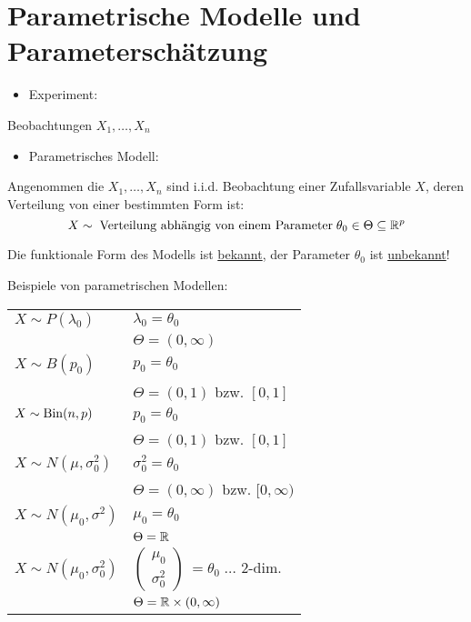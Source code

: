 \documentclass{tstextbook}
\begin{document}
\section{Parametrische Modelle und Parameterschätzung}
		\label{parameterschaetzung}


\begin{itemize}
	\item Experiment:
\end{itemize}
Beobachtungen $ X_1,\ldots,X_n $\\

\begin{itemize}
	\item Parametrisches Modell:
\end{itemize}
Angenommen die $ X_1,\ldots,X_n $ sind i.i.d. Beobachtung einer Zufallsvariable $ X $, deren 
Verteilung von einer bestimmten Form ist:
	\[
	X\sim \; \text{Verteilung abhängig von einem Parameter} \; \theta_0 \in \Theta \subseteq \mathbb R^p
	\]
	
Die funktionale Form des Modells ist \underline{bekannt}, der Parameter $ \theta_0 $ ist \underline{unbekannt}!

\begin{example}
	Beispiele von parametrischen Modellen: \\
	
	\begin{center}
	\begin{tabular}{l|l}
			$ X\sim P(\lambda_0) $ 	& $ \lambda_0 = \theta_0 $ 				 \\
									& $ \Theta = \left(0,\infty\right) $ 	\\
			\midrule
			$ X\sim B(p_0) $		& $ p_0= \theta_0 $							\\
									& $ \Theta = \left(0,1\right) $ bzw. $ \left[0,1\right] $  \\
			\midrule
			$ X\sim \operatorname{Bin}(n,p)  $	& $ p_0= \theta_0 $						\\
			& $ \Theta = \left(0,1\right) $ bzw. $ \left[0,1\right] $  \\	
			\midrule
			$ X \sim N(\mu,\sigma_0^2) $ & $ \sigma_0^2 = \theta_0 $	 \\
									& $ \Theta = \left(0,\infty\right) $ bzw. $ [0,\infty) $  \\
			\midrule
			$ X \sim N(\mu_0,\sigma^2) $ & $ \mu_0 = \theta_0 $  \\
			& $ \Theta = \mathbb R $  \\
			\midrule
			$ X \sim N(\mu_0,\sigma_0^2) $ & $ \begin{pmatrix}
				\mu_0 \\ \sigma_0^2
			\end{pmatrix}\ = \theta_0 \; \ldots $ 2-dim.	 \\
			& $ \Theta = \mathbb R \times (0,\infty) $   		
		\end{tabular}
	\end{center}

\end{example}
\end{document}
